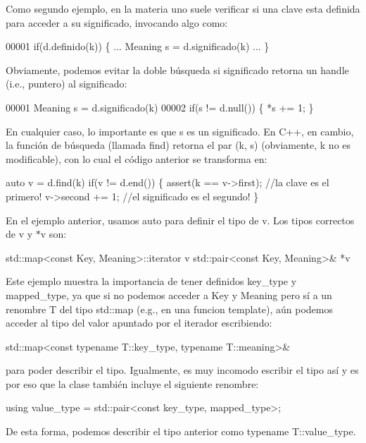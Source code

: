 Como segundo ejemplo, en la materia uno suele verificar si una clave esta definida para acceder a su significado, invocando algo como\+: 
\begin{DoxyCode}
00001 if(d.definido(k)) \{ ... Meaning s = d.significado(k) ... \}
\end{DoxyCode}
 Obviamente, podemos evitar la doble búsqueda si {\ttfamily significado} retorna un handle (i.\+e., puntero) al significado\+: 
\begin{DoxyCode}
00001 Meaning s = d.significado(k)
00002 if(s != d.null()) \{ *s += 1; \}
\end{DoxyCode}
 En cualquier caso, lo importante es que {\ttfamily s} es un significado. En C++, en cambio, la función de búsqueda (llamada {\ttfamily find}) retorna el par {\ttfamily (k, s)} (obviamente, {\ttfamily k} no es modificable), con lo cual el código anterior se transforma en\+: 
\begin{DoxyCode}
\textcolor{keyword}{auto} v = d.find(k)
\textcolor{keywordflow}{if}(v != d.end()) \{
   assert(k == v->first); \textcolor{comment}{//la clave es el primero!}
   v->second += 1;        \textcolor{comment}{//el significado es el segundo!}
\}
\end{DoxyCode}


En el ejemplo anterior, usamos {\ttfamily auto} para definir el tipo de {\ttfamily v}. Los tipos correctos de {\ttfamily v} y {\ttfamily $\ast$v} son\+: 
\begin{DoxyCode}
std::map<const Key, Meaning>::iterator v
std::pair<const Key, Meaning>& *v
\end{DoxyCode}
 Este ejemplo muestra la importancia de tener definidos {\ttfamily key\+\_\+type} y {\ttfamily mapped\+\_\+type}, ya que si no podemos acceder a Key y Meaning pero sí a un renombre T del tipo std\+::map (e.\+g., en una funcion template), aún podemos acceder al tipo del valor apuntado por el iterador escribiendo\+: 
\begin{DoxyCode}
std::map<const typename T::key\_type, typename T::meaning>&
\end{DoxyCode}
 para poder describir el tipo. Igualmente, es muy incomodo escribir el tipo así y es por eso que la clase también incluye el siguiente renombre\+: 
\begin{DoxyCode}
\textcolor{keyword}{using} value\_type = std::pair<const key\_type, mapped\_type>;
\end{DoxyCode}
 De esta forma, podemos describir el tipo anterior como {\ttfamily typename T\+::value\+\_\+type}.

